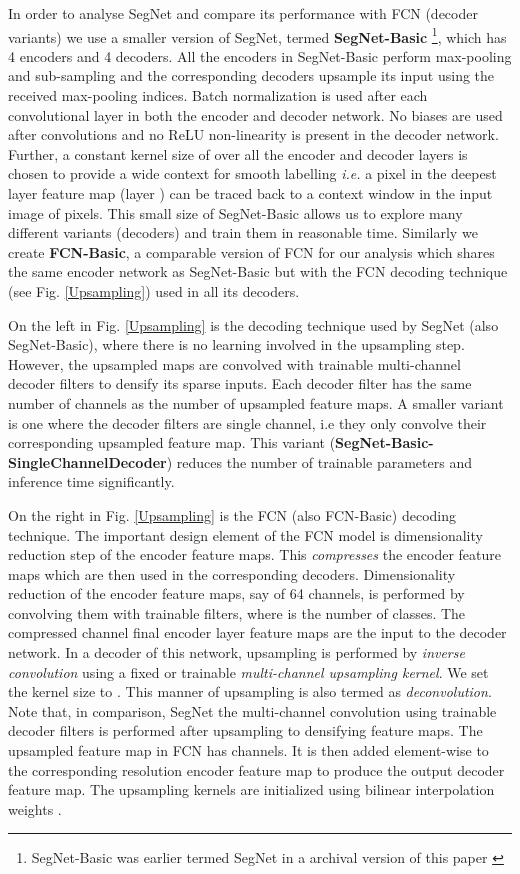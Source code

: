 \documentclass[10pt,journal,compsoc]{IEEEtran}
\begin{document}
In order to analyse SegNet and compare its performance with FCN (decoder variants) we use a smaller version of SegNet, termed \textbf{SegNet-Basic} \footnote{SegNet-Basic was earlier termed SegNet in a archival version of this paper \cite{SegNetarXiv}}, which has 4 encoders and 4 decoders. All the encoders in SegNet-Basic perform max-pooling and sub-sampling and the corresponding decoders upsample its input using the received max-pooling indices. Batch normalization is used after each convolutional layer in both the encoder and decoder network. No biases are used after convolutions and no ReLU non-linearity is present in the decoder network. Further, a constant kernel size of  over all the encoder and decoder layers is chosen to provide a wide context for smooth labelling \textit{i.e.} a pixel in the deepest layer feature map (layer ) can be traced back to a context window in the input image of  pixels. This small size of SegNet-Basic allows us to explore many different variants (decoders) and train them in reasonable time. Similarly we create \textbf{FCN-Basic}, a comparable version of FCN for our analysis which shares the same encoder network as SegNet-Basic but with the FCN decoding technique (see Fig. \ref{Upsampling}) used in all its decoders.  

On the left in Fig. \ref{Upsampling} is the decoding technique used by SegNet (also SegNet-Basic), where there is no learning involved in the upsampling step. However, the upsampled maps are convolved with trainable multi-channel decoder filters to densify its sparse inputs. Each decoder filter has the same number of channels as the number of upsampled feature maps. A smaller variant is one where the decoder filters are single channel, i.e they only convolve their corresponding upsampled feature map. This variant (\textbf{SegNet-Basic-SingleChannelDecoder}) reduces the number of trainable parameters and inference time significantly.

On the right in Fig. \ref{Upsampling} is the FCN (also FCN-Basic) decoding technique. The important design element of the FCN model is dimensionality reduction step of the encoder feature maps. This \textit{compresses} the encoder feature maps which are then used in the corresponding decoders. Dimensionality reduction of the encoder feature maps, say of 64 channels, is performed by convolving them with  trainable filters, where  is the number of classes. The compressed  channel final encoder layer feature maps are the input to the decoder network. In a decoder of this network, upsampling is performed by \textit{inverse convolution} using a fixed or trainable \textit{multi-channel upsampling kernel}. We set the kernel size to . This manner of upsampling is also termed as \textit{deconvolution}. Note that, in comparison, SegNet the multi-channel convolution using trainable decoder filters is performed after upsampling to densifying feature maps. The upsampled feature map in FCN has  channels. It is then added element-wise to the corresponding resolution encoder feature map to produce the output decoder feature map. The upsampling kernels are initialized using bilinear interpolation weights \cite{FCN}. 
\end{document}
